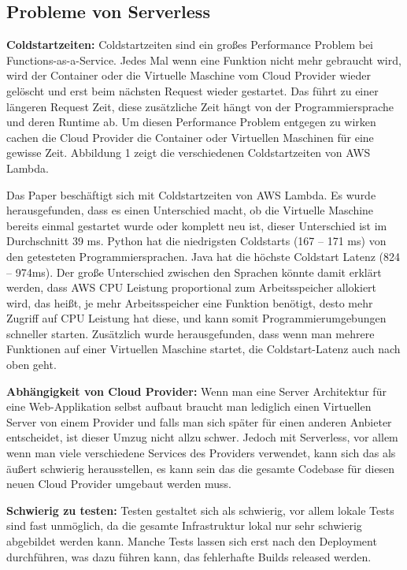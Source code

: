 \subsection{Probleme von Serverless}

\begin{flushleft}
\textbf{Coldstartzeiten:} Coldstartzeiten sind ein großes Performance Problem bei Functions-as-a-Service. \autocite[]{Lloyd} Jedes Mal wenn eine Funktion nicht mehr gebraucht wird, wird der Container oder die Virtuelle Maschine vom Cloud Provider wieder gelöscht und erst beim nächsten Request wieder gestartet. Das führt zu einer längeren Request Zeit, diese zusätzliche Zeit hängt von der Programmiersprache und deren Runtime ab. Um diesen Performance Problem entgegen zu wirken cachen die Cloud Provider die Container oder Virtuellen Maschinen für eine gewisse Zeit. \autocite[]{Hall2019} Abbildung 1 zeigt die verschiedenen Coldstartzeiten von AWS Lambda. \break

Das Paper \autocite[]{Wang} beschäftigt sich mit Coldstartzeiten von AWS Lambda. Es wurde herausgefunden, dass es einen Unterschied macht, ob die Virtuelle Maschine bereits einmal gestartet wurde oder komplett neu ist, dieser Unterschied ist im Durchschnitt 39 ms. Python hat die niedrigsten Coldstarts (167 – 171 ms) von den getesteten Programmiersprachen. Java hat die höchste Coldstart Latenz (824 – 974ms). Der große Unterschied zwischen den Sprachen könnte damit erklärt werden, dass AWS CPU Leistung proportional zum Arbeitsspeicher allokiert wird, das heißt, je mehr Arbeitsspeicher eine Funktion benötigt, desto mehr Zugriff auf CPU Leistung hat diese, und kann somit Programmierumgebungen schneller starten. Zusätzlich wurde herausgefunden, dass wenn man mehrere Funktionen auf einer Virtuellen Maschine startet, die Coldstart-Latenz auch nach oben geht. \break


\textbf{Abhängigkeit von Cloud Provider:} Wenn man eine Server Architektur für eine Web-Applikation selbst aufbaut braucht man lediglich einen Virtuellen Server von einem Provider und falls man sich später für einen anderen Anbieter entscheidet, ist dieser Umzug nicht allzu schwer. Jedoch mit Serverless, vor allem wenn man viele verschiedene Services des Providers verwendet, kann sich das als äußert schwierig herausstellen, es kann sein das die gesamte Codebase für diesen neuen Cloud Provider umgebaut werden muss. \autocite[]{VanEyk2017} \break


\textbf{Schwierig zu testen:} Testen gestaltet sich als schwierig, vor allem lokale Tests sind fast unmöglich, da die gesamte Infrastruktur lokal nur sehr schwierig abgebildet werden kann. Manche Tests lassen sich erst nach den Deployment durchführen, was dazu führen kann, das fehlerhafte Builds released werden. \autocite[]{Manner2019} \break 

\end{flushleft}

